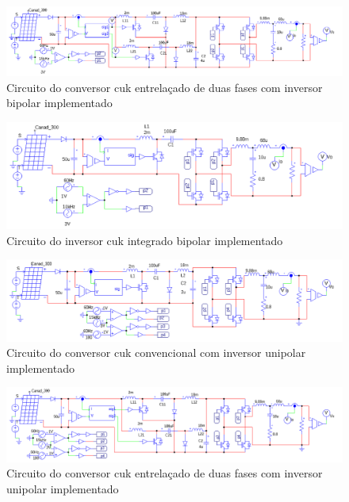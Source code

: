 \documentclass[
	12pt,				%
	openany,
	onseside,
	a4paper,			%
	english,			%
	french,				%
	spanish,			%
	brazil,				%
	]{abntex2}
\begin{document}
\begin{anexosenv}
\begin{figure}
\end{figure}

\begin{figure}
	\centering
	\includegraphics[width=\linewidth]{comp_interv_circ_clean}
	\caption{Circuito do conversor cuk entrelaçado de duas fases com inversor bipolar implementado}	
\end{figure}

\begin{figure}
	\centering
	\includegraphics[width=\linewidth]{comp_integ_circ_clean}
	\caption{Circuito do inversor cuk integrado bipolar implementado}	
\end{figure}


\begin{figure}
	\centering
	\includegraphics[width=\linewidth]{comp_conv_circ_clean_unip}
	\caption{Circuito do conversor cuk convencional com inversor unipolar implementado}	

\end{figure}

\begin{figure}
	\centering
	\includegraphics[width=\linewidth]{comp_interv_circ_clean_unip}
	\caption{Circuito do conversor cuk entrelaçado de duas fases com inversor unipolar implementado}	
\end{figure}


\end{anexosenv}
\end{document}
